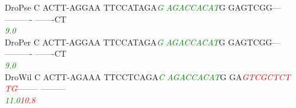 \documentclass[11pt,twoside,reqno,a4paper]{article}
\begin{document}
{DroPse	C	ACTT-AGGAA	TTCCATAGA\textit{\textcolor{Green}{G}}	\textit{\textcolor{Green}{A}}\textit{\textcolor{Green}{G}}\textit{\textcolor{Green}{A}}\textit{\textcolor{Green}{C}}\textit{\textcolor{Green}{C}}\textit{\textcolor{Green}{A}}\textit{\textcolor{Green}{C}}\textit{\textcolor{Green}{A}}\textit{\textcolor{Green}{T}}G	GAGTCGG---	----------	-------CT\\
\hspace*{7\charwidth}\hspace*{1\charwidth}\hspace*{1\charwidth}\hspace*{20\charwidth}\textit{\textcolor{Green}{9.0}}\hspace*{1\charwidth}\hspace*{1\charwidth}\hspace*{1\charwidth}\hspace*{1\charwidth}\\
DroPer	C	ACTT-AGGAA	TTCCATAGA\textit{\textcolor{Green}{G}}	\textit{\textcolor{Green}{A}}\textit{\textcolor{Green}{G}}\textit{\textcolor{Green}{A}}\textit{\textcolor{Green}{C}}\textit{\textcolor{Green}{C}}\textit{\textcolor{Green}{A}}\textit{\textcolor{Green}{C}}\textit{\textcolor{Green}{A}}\textit{\textcolor{Green}{T}}G	GAGTCGG---	----------	-------CT\\
\hspace*{7\charwidth}\hspace*{1\charwidth}\hspace*{1\charwidth}\hspace*{20\charwidth}\textit{\textcolor{Green}{9.0}}\hspace*{1\charwidth}\hspace*{1\charwidth}\hspace*{1\charwidth}\hspace*{1\charwidth}\\
DroWil	C	ACTT-AGAAA	TTCCTCAGA\textit{\textcolor{Green}{C}}	\textit{\textcolor{Green}{A}}\textit{\textcolor{Green}{G}}\textit{\textcolor{Green}{A}}\textit{\textcolor{Green}{C}}\textit{\textcolor{Green}{C}}\textit{\textcolor{Green}{A}}\textit{\textcolor{Green}{C}}\textit{\textcolor{Green}{A}}\textit{\textcolor{Green}{T}}G	GA\textit{\textcolor{Red}{G}}\textit{\textcolor{Red}{T}}\textit{\textcolor{Red}{C}}\textit{\textcolor{Red}{G}}\textit{\textcolor{Red}{C}}\textit{\textcolor{Red}{T}}\textit{\textcolor{Red}{C}}\textit{\textcolor{Red}{T}}	\textit{\textcolor{Red}{T}}\textit{\textcolor{Red}{G}}--------	---------\\
\hspace*{7\charwidth}\hspace*{1\charwidth}\hspace*{1\charwidth}\hspace*{20\charwidth}\textit{\textcolor{Green}{11.0}}\hspace*{1\charwidth}\hspace*{1\charwidth}\hspace*{9\charwidth}\textit{\textcolor{Red}{10.8}}\hspace*{1\charwidth}\hspace*{1\charwidth}\\
}
\end{document}
